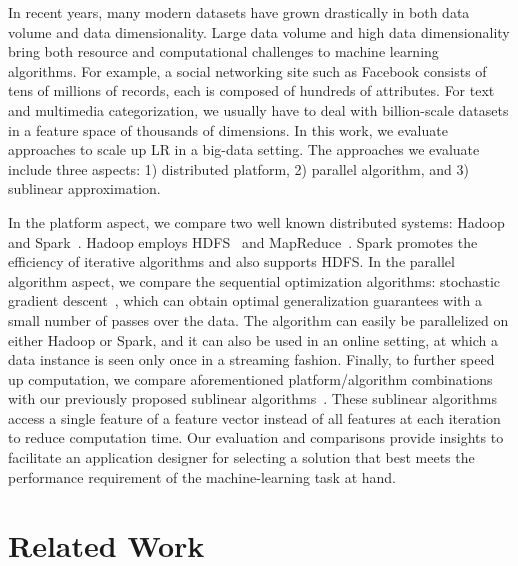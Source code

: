 \documentclass[10pt, conference, compsocconf]{IEEEtran}
\begin{document}
In recent years, many modern datasets have grown drastically in both data volume and data dimensionality.
Large data volume and high data dimensionality bring both resource and computational challenges to machine learning algorithms.
For example, a social networking site such as Facebook consists of tens of millions of records, each is composed of hundreds of attributes. For text and multimedia categorization, we usually have to deal with billion-scale datasets in a feature space of thousands of dimensions.  In this work, we evaluate approaches to scale up LR in a big-data setting.  The approaches we evaluate include three aspects: 1) distributed platform, 2) parallel algorithm, and 3) sublinear approximation.

In the platform aspect, we compare two well known distributed systems:
 Hadoop~\cite{white2012hadoop} and Spark~\cite{zaharia2010spark}.
Hadoop employs HDFS~\cite{borthakur2008hdfs} and MapReduce~\cite{dean2008mapreduce}.
Spark promotes the efficiency of iterative algorithms and also supports HDFS.
In the parallel algorithm aspect, we compare the sequential optimization algorithms: stochastic gradient descent~\cite{zhang2004solving}, which can
obtain optimal generalization guarantees with a small number of passes over the data.
 The algorithm can easily be parallelized on either Hadoop or Spark, and it can also be used in an online setting, at which a data instance is seen only once in a streaming fashion.  Finally, to further speed up computation, we compare aforementioned platform/algorithm combinations with our previously proposed sublinear algorithms~\cite{peng2012sublinear}.
These sublinear algorithms access a single feature of a feature vector instead of all features at each iteration to reduce computation time.
Our evaluation and comparisons provide insights to facilitate an application designer for selecting a solution that best meets the performance requirement of the machine-learning task at hand.

\section{Related Work} \label{sec:rew}
\end{document}
